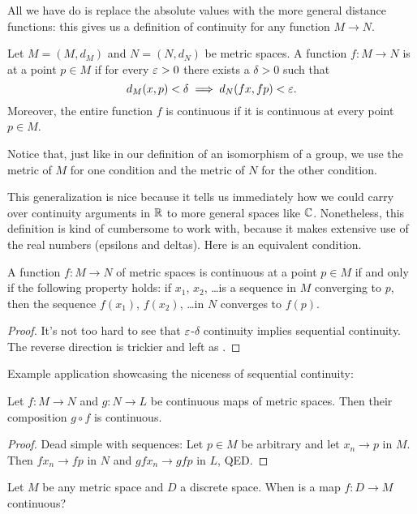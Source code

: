 All we have do is replace the absolute values with the more general distance functions: this gives us a definition of continuity for any function $M \to N$.

\begin{definition}
	Let $M = (M, d_M)$ and $N = (N, d_N)$ be metric spaces.
	A function $f : M \to N$ is  at a point $p \in M$
	if for every $\varepsilon > 0$ there exists a $\delta > 0$ such that
	\[ d_M(x,p) < \delta \implies d_N(fx, fp) < \varepsilon. \]
	Moreover, the entire function $f$ is continuous if it is continuous at every point $p \in M$.
\end{definition}
Notice that, just like in our definition of an isomorphism of a group,
we use the metric of $M$ for one condition
and the metric of $N$ for the other condition.

This generalization is nice because it tells us immediately how we could carry over continuity arguments in $\mathbb R$ to more general spaces like $\mathbb C$.
Nonetheless, this definition is kind of cumbersome to work with,
because it makes extensive use of the real numbers
(epsilons and deltas).
Here is an equivalent condition.
\begin{theorem}
	\label{thm:seq_cont}
	A function $f : M \to N$ of metric spaces is continuous at a point $p \in M$
	if and only if the following property holds:
	if $x_1$, $x_2$, \dots is a sequence in $M$ converging to $p$,
	then the sequence $f(x_1)$, $f(x_2)$, \dots in $N$ converges to $f(p)$.
\end{theorem}
\begin{proof}
	It's not too hard to see that $\varepsilon$-$\delta$ continuity implies sequential continuity.
	The reverse direction is trickier and left as .
\end{proof}

Example application showcasing the niceness of sequential continuity:
\begin{proposition}
	Let $f : M \to N$ and $g : N \to L$ be continuous maps of metric spaces.
	Then their composition $g \circ f$ is continuous.
\end{proposition}
\begin{proof}
	Dead simple with sequences:
	Let $p \in M$ be arbitrary and let $x_n \to p$ in $M$.
	Then $fx_n \to fp$ in $N$ and $gfx_n \to gfp$ in $L$, QED.
\end{proof}

\begin{ques}
	Let $M$ be any metric space and $D$ a discrete space.
	When is a map $f : D \to M$ continuous?
\end{ques}



